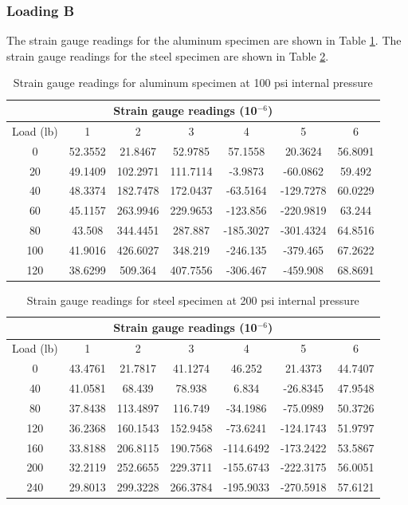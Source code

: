 \documentclass[12pt, titlepage]{article}
\begin{document}
\subsubsection{Loading B}
The strain gauge readings for the aluminum specimen are shown in Table \ref{tab:alu_B}.
The strain gauge readings for the steel specimen are shown in Table \ref{tab:steel_B}.
\begin{table}[H]
\begin{tabular}{|c|c|c|c|c|c|c|} \hline
\multicolumn{7}{|c|}{Strain gauge readings (10$^{-6}$)} \\ \hline
Load (lb) & 1 & 2 & 3 & 4 & 5 & 6 \\ \hline
0 & 52.3552 & 21.8467 & 52.9785 & 57.1558 & 20.3624 & 56.8091 \\ \hline
20 & 49.1409 & 102.2971 & 111.7114 & -3.9873 & -60.0862 & 59.492 \\ \hline
40 & 48.3374 & 182.7478 & 172.0437 & -63.5164 & -129.7278 & 60.0229 \\ \hline
60 & 45.1157 & 263.9946 & 229.9653 & -123.856 & -220.9819 & 63.244 \\ \hline
80 & 43.508 & 344.4451 & 287.887 & -185.3027 & -301.4324 & 64.8516 \\ \hline
100 & 41.9016 & 426.6027 & 348.219 & -246.135 & -379.465 & 67.2622 \\ \hline
120 & 38.6299 & 509.364 & 407.7556 & -306.467 & -459.908 & 68.8691 \\ \hline
\end{tabular}
\captionsetup{justification=raggedright,singlelinecheck=false}
\caption{Strain gauge readings for aluminum specimen at 100 psi internal pressure}
\label{tab:alu_B}
\end{table}

\begin{table}[H]
\begin{tabular}{|c|c|c|c|c|c|c|} \hline
\multicolumn{7}{|c|}{Strain gauge readings (10$^{-6}$)} \\ \hline
Load (lb) & 1 & 2 & 3 & 4 & 5 & 6 \\ \hline
0 & 43.4761 & 21.7817 & 41.1274 & 46.252 & 21.4373 & 44.7407 \\ \hline
40 & 41.0581 & 68.439 & 78.938 & 6.834 & -26.8345 & 47.9548 \\ \hline
80 & 37.8438 & 113.4897 & 116.749 & -34.1986 & -75.0989 & 50.3726 \\ \hline
120 & 36.2368 & 160.1543 & 152.9458 & -73.6241 & -124.1743 & 51.9797 \\ \hline
160 & 33.8188 & 206.8115 & 190.7568 & -114.6492 & -173.2422 & 53.5867 \\ \hline
200 & 32.2119 & 252.6655 & 229.3711 & -155.6743 & -222.3175 & 56.0051 \\ \hline
240 & 29.8013 & 299.3228 & 266.3784 & -195.9033 & -270.5918 & 57.6121 \\ \hline
\end{tabular}
\captionsetup{justification=raggedright,singlelinecheck=false}
\caption{Strain gauge readings for steel specimen at 200 psi internal pressure}
\label{tab:steel_B}
\end{table}
\newpage
\end{document}
